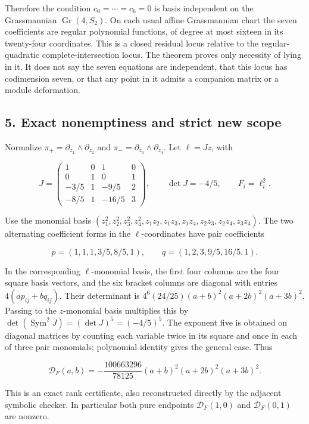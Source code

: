 Therefore the condition \(c_0=\cdots=c_6=0\) is basis independent on the
Grassmannian \(\operatorname{Gr}(4,S_2)\). On each usual affine
Grassmannian chart the seven coefficients are regular polynomial
functions, of degree at most sixteen in its twenty-four coordinates.
This is a closed residual locus relative to the regular-quadratic
complete-intersection locus. The theorem proves only necessity of lying
in it. It does not say the seven equations are independent, that this
locus has codimension seven, or that any point in it admits a companion
matrix or a module deformation.

\subsection{5. Exact nonemptiness and strict new
scope}\label{exact-nonemptiness-and-strict-new-scope}

Normalize \(\pi_+=\partial_{z_1}\wedge\partial_{z_2}\) and
\(\pi_-=\partial_{z_3}\wedge\partial_{z_4}\). Let \(\ell=Jz\), with

\[
 J=\begin{pmatrix}
 1&0&1&0\\
 0&1&0&1\\
 -3/5&1&-9/5&2\\
 -8/5&1&-16/5&3
 \end{pmatrix},\qquad
 \det J=-4/5,\qquad F_i=\ell_i^2.
 \tag{E838.17}
\]

Use the monomial basis
\((z_1^2,z_2^2,z_3^2,z_4^2,z_1z_2,z_1z_3,z_1z_4,z_2z_3,z_2z_4,z_3z_4)\).
The two alternating coefficient forms in the \(\ell\)-coordinates have
pair coefficients

\[
 p=(1,1,1,3/5,8/5,1),\qquad
 q=(1,2,3,9/5,16/5,1).
 \tag{E838.18}
\]

In the corresponding \(\ell\)-monomial basis, the first four columns are
the four square basis vectors, and the six bracket columns are diagonal
with entries \(4(ap_{ij}+bq_{ij})\). Their determinant is
\(4^6(24/25)(a+b)^2(a+2b)^2(a+3b)^2\). Passing to the \(z\)-monomial
basis multiplies this by
\(\det(\operatorname{Sym}^2J)=(\det J)^5=(-4/5)^5\). The exponent five
is obtained on diagonal matrices by counting each variable twice in its
square and once in each of three pair monomials; polynomial identity
gives the general case. Thus

\[
 \mathcal D_F(a,b)
   =-\frac{100663296}{78125}
       (a+b)^2(a+2b)^2(a+3b)^2.
 \tag{E838.19}
\]

This is an exact rank certificate, also reconstructed directly by the
adjacent symbolic checker. In particular both pure endpoints
\(\mathcal D_F(1,0)\) and \(\mathcal D_F(0,1)\) are nonzero.

